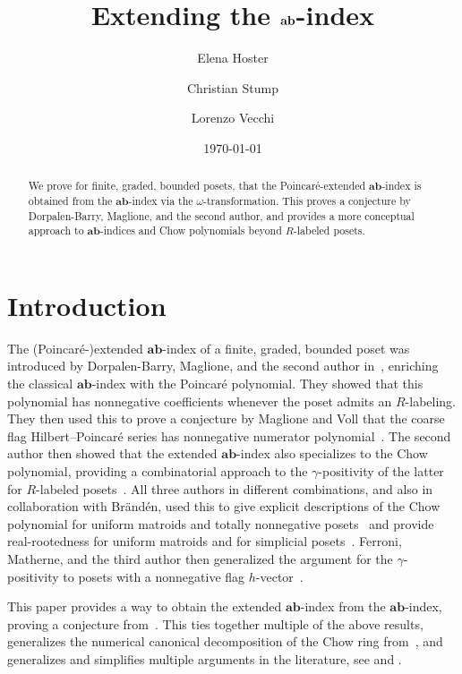 \documentclass[a4paper, english,reqno, 11pt]{amsart}
\title{Extending the $\aaa\bbb$-index}
\author[E.~Hoster]{Elena Hoster}
\author[C.~Stump]{Christian Stump}
\author[L.~Vecchi]{Lorenzo Vecchi}
\date{\today}
\theoremstyle{plain}
\theoremstyle{definition}
\newcommand{\aaa}{\mathbf{a}}
\newcommand{\bbb}{\mathbf{b}}
\begin{document}
\begin{abstract}
  We prove for finite, graded, bounded posets, that the Poincaré-extended $\aaa\bbb$-index is obtained from the $\aaa\bbb$-index via the $\omega$-transformation.
  This proves a conjecture by Dorpalen-Barry, Maglione, and the second author, and provides a more conceptual approach to $\aaa\bbb$-indices and Chow polynomials beyond $R$-labeled posets.
\end{abstract}

\maketitle

\section{Introduction}

The (Poincaré-)extended $\aaa\bbb$-index of a finite, graded, bounded poset was introduced by Dorpalen-Barry, Maglione, and the second author in~\cite{poincareextended}, enriching the classical $\aaa\bbb$-index with the Poincaré polynomial.
They showed that this polynomial has nonnegative coefficients whenever the poset admits an $R$-labeling.
They then used this to prove a conjecture by Maglione and Voll that the coarse flag Hilbert--Poincaré series has nonnegative numerator polynomial~\cite{MaglioneVoll}.
The second author then showed that the extended $\aaa\bbb$-index also specializes to the Chow polynomial, providing a combinatorial approach to the $\gamma$-positivity of the latter for $R$-labeled posets~\cite{Stump}.
All three authors in different combinations, and also in collaboration with Brändén, used this to give explicit descriptions of the Chow polynomial for uniform matroids and totally nonnegative posets~\cite{2024arXiv241022329H,brandenvecchi} and provide real-rootedness for uniform matroids and for simplicial posets~\cite{2025arXiv250107364B,2025arXiv250815538H}.
Ferroni, Matherne, and the third author then generalized the argument for the $\gamma$-positivity to posets with a nonnegative flag $h$-vector~\cite{ferroni-matherne-vecchi}.

\medskip

This paper provides a way to obtain the extended $\aaa\bbb$-index from the $\aaa\bbb$-index, proving a conjecture from~\cite{poincareextended}.
This ties together multiple of the above results, generalizes the numerical canonical decomposition of the Chow ring from~\cite{ferroni-matherne-vecchi}, and generalizes and simplifies multiple arguments in the literature, see  and .
\end{document}
